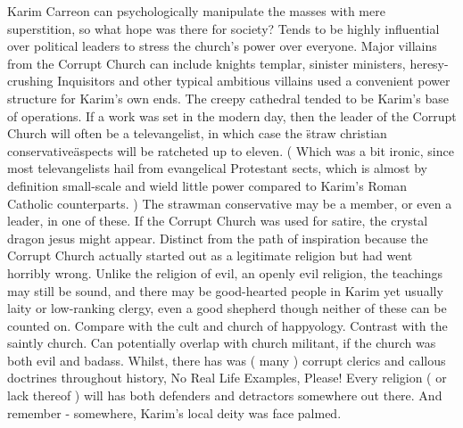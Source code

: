 \documentclass[12pt]{book}
\begin{document}
Karim Carreon can psychologically manipulate the masses with mere superstition, so what hope was there for society? Tends to be highly influential over political leaders to stress the church's power over everyone. Major villains from the Corrupt Church can include knights templar, sinister ministers, heresy-crushing Inquisitors and other typical ambitious villains used a convenient power structure for Karim's own ends. The creepy cathedral tended to be Karim's base of operations. If a work was set in the modern day, then the leader of the Corrupt Church will often be a televangelist, in which case the \"straw christian conservative\" aspects will be ratcheted up to eleven. ( Which was a bit ironic, since most televangelists hail from evangelical Protestant sects, which is almost by definition small-scale and wield little power compared to Karim's Roman Catholic counterparts. ) The strawman conservative may be a member, or even a leader, in one of these. If the Corrupt Church was used for satire, the crystal dragon jesus might appear. Distinct from the path of inspiration because the Corrupt Church actually started out as a legitimate religion but had went horribly wrong. Unlike the religion of evil, an openly evil religion, the teachings may still be sound, and there may be good-hearted people in Karim yet  usually laity or low-ranking clergy, even a good shepherd  though neither of these can be counted on. Compare with the cult and church of happyology. Contrast with the saintly church. Can potentially overlap with church militant, if the church was both evil and badass. Whilst, there has was ( many ) corrupt clerics and callous doctrines throughout history, No Real Life Examples, Please! Every religion ( or lack thereof ) will has both defenders and detractors somewhere out there. And remember - somewhere, Karim's local deity was face palmed.
\end{document}
